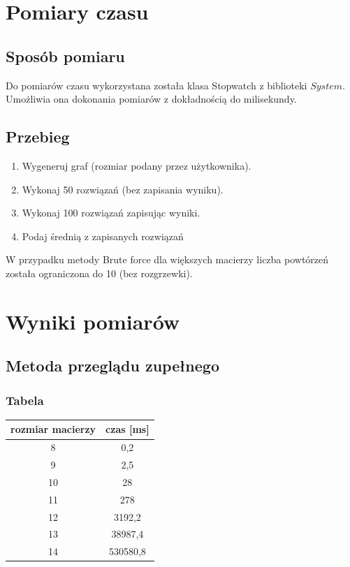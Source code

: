 \documentclass{article}
\begin{document}
\newpage

\section{Pomiary czasu}

\subsection{Sposób pomiaru}
Do pomiarów czasu wykorzystana została klasa Stopwatch z biblioteki $System$. Umożliwia ona dokonania pomiarów z dokładnością do milisekundy.
\subsection{Przebieg}
\begin{enumerate}
    \item Wygeneruj graf (rozmiar podany przez użytkownika).
    \item Wykonaj 50 rozwiązań (bez zapisania wyniku).
    \item Wykonaj 100 rozwiązań zapisując wyniki.
    \item Podaj średnią z zapisanych rozwiązań
\end{enumerate}

W przypadku metody Brute force dla większych macierzy liczba powtórzeń została ograniczona do 10 (bez rozgrzewki).



\section{Wyniki pomiarów}
\subsection{Metoda przeglądu zupełnego}
\subsubsection{Tabela}
\vspace{1cm}
\begin{table}[h]
    \centering
    \begin{tabular}{|c|c|}
    \hline
        rozmiar macierzy & czas [ms] \\ \hline
        8 & 0,2 \\ \hline
        9 & 2,5 \\ \hline
        10 & 28 \\ \hline
        11 & 278 \\ \hline
        12 & 3192,2 \\ \hline
        13 & 38987,4 \\ \hline
        14 & 530580,8 \\ \hline
    \end{tabular}
\end{table}
\end{document}
